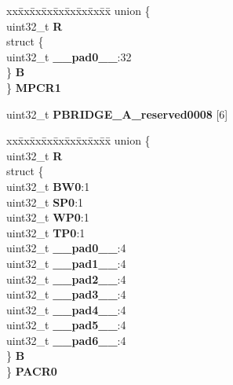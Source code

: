 \begin{DoxyCompactItemize}
\begin{tabbing}
\end{tabbing}\item 
\mbox{\label{structPBRIDGE__A__tag_ab7b772c88208d7f06219653f8ca36758}} 
\begin{tabbing}
xx\=xx\=xx\=xx\=xx\=xx\=xx\=xx\=xx\=\kill
union \{\\
\>uint32\_t {\bfseries R}\\
\>struct \{\\
\>\>uint32\_t {\bfseries \_\_pad0\_\_}:32\\
\>\} {\bfseries B}\\
\} {\bfseries MPCR1}\\

\end{tabbing}\item 
\mbox{\label{structPBRIDGE__A__tag_a5f87c5a6f76dcd388568349f68abc0be}} 
uint32\+\_\+t {\bfseries P\+B\+R\+I\+D\+G\+E\+\_\+\+A\+\_\+reserved0008} \mbox{[}6\mbox{]}
\item 
\mbox{\label{structPBRIDGE__A__tag_a65a7150d966b746ee33819a24b554bf9}} 
\begin{tabbing}
xx\=xx\=xx\=xx\=xx\=xx\=xx\=xx\=xx\=\kill
union \{\\
\>uint32\_t {\bfseries R}\\
\>struct \{\\
\>\>uint32\_t {\bfseries BW0}:1\\
\>\>uint32\_t {\bfseries SP0}:1\\
\>\>uint32\_t {\bfseries WP0}:1\\
\>\>uint32\_t {\bfseries TP0}:1\\
\>\>uint32\_t {\bfseries \_\_pad0\_\_}:4\\
\>\>uint32\_t {\bfseries \_\_pad1\_\_}:4\\
\>\>uint32\_t {\bfseries \_\_pad2\_\_}:4\\
\>\>uint32\_t {\bfseries \_\_pad3\_\_}:4\\
\>\>uint32\_t {\bfseries \_\_pad4\_\_}:4\\
\>\>uint32\_t {\bfseries \_\_pad5\_\_}:4\\
\>\>uint32\_t {\bfseries \_\_pad6\_\_}:4\\
\>\} {\bfseries B}\\
\} {\bfseries PACR0}\\


\end{tabbing}
\end{DoxyCompactItemize}
